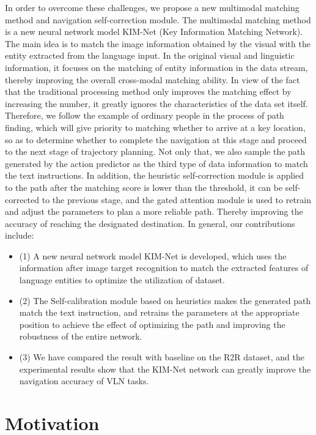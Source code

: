 In order to overcome these challenges, we propose a new multimodal matching method and navigation self-correction module. The multimodal matching method is a new neural network model KIM-Net (Key Information Matching Network). The main idea is to match the image information obtained by the visual with the entity extracted from the language input. In the original visual and linguistic information, it focuses on the matching of entity information in the data stream, thereby improving the overall cross-modal matching ability. In view of the fact that the traditional processing method only improves the matching effect by increasing the number, it greatly ignores the characteristics of the data set itself. Therefore, we follow the example of ordinary people in the process of path finding, which will give priority to matching whether to arrive at a key location, so as to determine whether to complete the navigation at this stage and proceed to the next stage of trajectory planning. Not only that, we also sample the path generated by the action predictor as the third type of data information to match the text instructions. In addition, the heuristic self-correction module is applied to the path after the matching score is lower than the threshold, it can be self-corrected to the previous stage, and the gated attention module is used to retrain and adjust the parameters to plan a more reliable path. Thereby improving the accuracy of reaching the designated destination. In general, our contributions include:
	
\begin{itemize}
		\item[](1) A new neural network model KIM-Net is developed, which uses the information after image target recognition to match the extracted features of language entities to optimize the utilization of dataset.
		\item[](2) The Self-calibration module based on heuristics makes the generated path match the text instruction, and retrains the parameters at the appropriate position to achieve the effect of optimizing the path and improving the robustness of the entire network.
		\item[](3) We have compared the result with baseline on the R2R dataset, and the experimental results show that the KIM-Net network can greatly improve the navigation accuracy of VLN tasks.
\end{itemize}
\section{Motivation}
	
